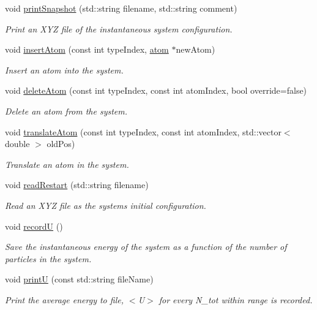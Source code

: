 \begin{DoxyCompactItemize}
void \hyperlink{classsim_system_ac5096ab2cf643bc5c4f9e6ca0612b13b}{print\+Snapshot} (std\+::string filename, std\+::string comment)
\begin{DoxyCompactList}\small\item\em Print an X\+Y\+Z file of the instantaneous system configuration. \end{DoxyCompactList}\item 
void \hyperlink{classsim_system_a6c1e86f585f3a52aa82b6394ffbf1c6a}{insert\+Atom} (const int type\+Index, \hyperlink{classatom}{atom} $\ast$new\+Atom)
\begin{DoxyCompactList}\small\item\em Insert an atom into the system. \end{DoxyCompactList}\item 
void \hyperlink{classsim_system_acabf4fc5b5b90bba62e1449ddb3646c6}{delete\+Atom} (const int type\+Index, const int atom\+Index, bool override=false)
\begin{DoxyCompactList}\small\item\em Delete an atom from the system. \end{DoxyCompactList}\item 
void \hyperlink{classsim_system_a22fdaceea44abd6cd021bac1ecd11890}{translate\+Atom} (const int type\+Index, const int atom\+Index, std\+::vector$<$ double $>$ old\+Pos)
\begin{DoxyCompactList}\small\item\em Translate an atom in the system. \end{DoxyCompactList}\item 
void \hyperlink{classsim_system_afcd8467fd7611184ad32138fc410813c}{read\+Restart} (std\+::string filename)
\begin{DoxyCompactList}\small\item\em Read an X\+Y\+Z file as the system\textquotesingle{}s initial configuration. \end{DoxyCompactList}\item 
void \hyperlink{classsim_system_a11a8994c279ba6f643420f4be57a9b2d}{record\+U} ()
\begin{DoxyCompactList}\small\item\em Save the instantaneous energy of the system as a function of the number of particles in the system. \end{DoxyCompactList}\item 
void \hyperlink{classsim_system_a6cfe3d83219a4886991ba0135d46faa7}{print\+U} (const std\+::string file\+Name)
\begin{DoxyCompactList}\small\item\em Print the average energy to file, $<$\+U$>$ for every N\+\_\+tot within range is recorded. \end{DoxyCompactList}\item 

\end{DoxyCompactItemize}
